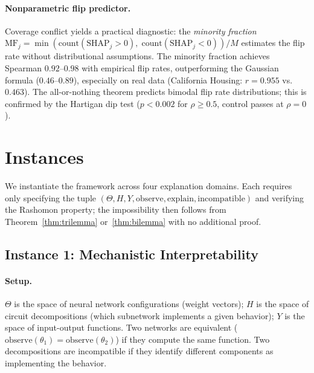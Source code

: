 \documentclass{article}
\begin{document}
\paragraph{Nonparametric flip predictor.}
Coverage conflict yields a practical diagnostic: the \emph{minority fraction}
$\text{MF}_j = \min(\text{count}(\text{SHAP}_j > 0),\;
\text{count}(\text{SHAP}_j < 0))/M$ estimates the flip rate without
distributional assumptions.
The minority fraction achieves Spearman $0.92$--$0.98$ with empirical
flip rates, outperforming the Gaussian formula ($0.46$--$0.89$),
especially on real data (California Housing: $r = 0.955$ vs.\ $0.463$).
The all-or-nothing theorem predicts bimodal flip rate distributions;
this is confirmed by the Hartigan dip test ($p < 0.002$ for
$\rho \geq 0.5$, control passes at $\rho = 0$).

\section{Instances}
\label{sec:instances}

We instantiate the framework across four explanation domains.
Each requires only specifying the tuple $(\Theta, H, Y, \mathrm{observe},
\mathrm{explain}, \mathrm{incompatible})$ and verifying the Rashomon
property; the impossibility then follows from Theorem~\ref{thm:trilemma}
or~\ref{thm:bilemma} with no additional proof.

\subsection{Instance 1: Mechanistic Interpretability}
\label{sec:mech-interp}

\paragraph{Setup.}
$\Theta$ is the space of neural network configurations (weight vectors);
$H$ is the space of circuit decompositions (which subnetwork implements a
given behavior);
$Y$ is the space of input-output functions.
Two networks are equivalent ($\mathrm{observe}(\theta_1) =
\mathrm{observe}(\theta_2)$) if they compute the same function.
Two decompositions are incompatible if they identify different components
as implementing the behavior.
\end{document}
